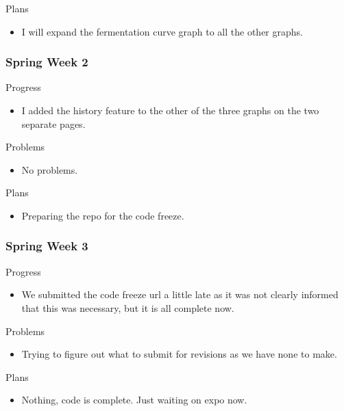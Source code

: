         \noindent
        Plans
        \begin{itemize}
            \item I will expand the fermentation curve graph to all the other graphs.
        \end{itemize}
        
    \subsubsection{Spring Week 2}
    
        \noindent
        Progress
        \begin{itemize}
            \item I added the history feature to the other of the three graphs on the two separate pages.
        \end{itemize}
        
        \noindent
        Problems
        \begin{itemize}
            \item No problems.
        \end{itemize}
        
        \noindent
        Plans
        \begin{itemize}
            \item Preparing the repo for the code freeze.
        \end{itemize}
        
    \subsubsection{Spring Week 3}
    
        \noindent
        Progress
        \begin{itemize}
            \item We submitted the code freeze url a little late as it was not clearly informed that this was necessary, but it is all complete now.
        \end{itemize}
        
        \noindent
        Problems
        \begin{itemize}
            \item Trying to figure out what to submit for revisions as we have none to make.
        \end{itemize}
        
        \noindent
        Plans
        \begin{itemize}
            \item Nothing, code is complete.  Just waiting on expo now.
        \end{itemize}
        
